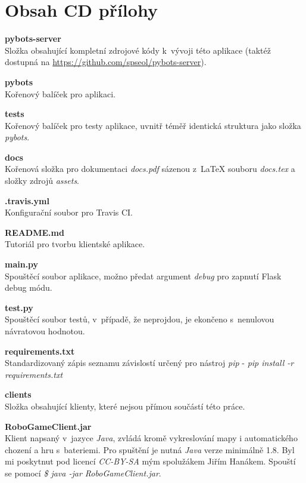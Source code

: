 \documentclass[11pt]{extarticle}
\begin{document}
\pagestyle{empty}
	{\centering \section*{Obsah CD přílohy}}
	\begin{description}
		\item \textbf{pybots-server}\\
		Složka obsahující kompletní zdrojové kódy k~vývoji této aplikace (taktéž dostupná na \url{https://github.com/spseol/pybots-server}).
			\begin{description}
				\item \textbf{pybots}\\
				Kořenový balíček pro aplikaci.
				\item \textbf{tests}\\
				Kořenový balíček pro testy aplikace, uvnitř téměř identická struktura jako složka \emph{pybots}.
				\item \textbf{docs}\\
				Kořenová složka pro dokumentaci \emph{docs.pdf} sázenou z~\LaTeX{} souboru \emph{docs.tex} a složky zdrojů \emph{assets}.
				\item \textbf{.travis.yml}\\
				Konfigurační soubor pro Travis CI.
				\item \textbf{README.md}\\
				Tutoriál pro tvorbu klientské aplikace.
				\item \textbf{main.py}\\
				Spouštěcí soubor aplikace, možno předat argument \emph{debug} pro zapnutí Flask debug módu.
				\item \textbf{test.py}\\
				Spouštěcí soubor testů, v~případě, že neprojdou, je ekončeno s~nenulovou návratovou hodnotou.
				\item \textbf{requirements.txt}\\
				Standardizovaný zápis seznamu závislostí určený pro nástroj \emph{pip} - \emph{pip install -r requirements.txt}
			\end{description}
		\item \textbf{clients}\\
		Složka obsahující klienty, které nejsou přímou součástí této práce.
		\begin{description}
			\item \textbf{RoboGameClient.jar} \\
			Klient napsaný v~jazyce \emph{Java}, zvládá kromě vykreslování mapy i automatického chození a hru s~bateriemi. Pro spuštění je nutná \emph{Java} verze minimálně 1.8. Byl mi poskytnut pod licencí \emph{CC-BY-SA} mým spolužákem Jiřím Hanákem. Spouští se pomocí \emph{\$ java -jar RoboGameClient.jar}.

\end{description}
\end{description}
\end{document}
